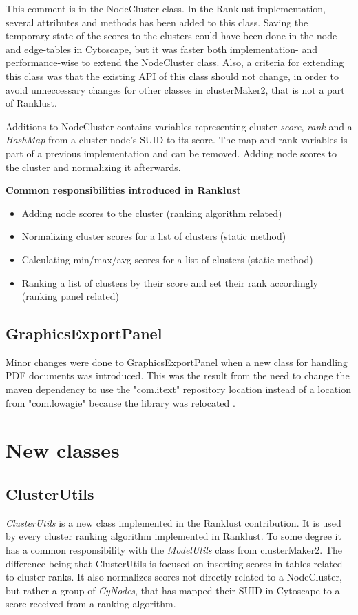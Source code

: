 This comment is in the NodeCluster class. In the Ranklust implementation,
several attributes and methods has been added to this class. Saving the
temporary state of the scores to the clusters could have been done in the node
and edge-tables in Cytoscape, but it was faster both implementation- and
performance-wise to extend the NodeCluster class. Also, a criteria for extending
this class was that the existing API of this class should not change, in order
to avoid unneccessary changes for other classes in clusterMaker2, that is not
a part of Ranklust. 

Additions to NodeCluster contains variables representing cluster \textit{score},
\textit{rank} and a \textit{HashMap} from a cluster-node's SUID to its score.
The map and rank variables is part of a previous implementation and can be
removed. Adding node scores to the cluster and normalizing it afterwards.

\textbf{Common responsibilities introduced in Ranklust}
\begin{itemize}
    \item Adding node scores to the cluster (ranking algorithm related)
    \item Normalizing cluster scores for a list of clusters (static method)
    \item Calculating min/max/avg scores for a list of clusters (static method)
    \item Ranking a list of clusters by their score and set their rank
        accordingly (ranking panel related)
\end{itemize}

\subsection{GraphicsExportPanel}
Minor changes were done to GraphicsExportPanel when a new class for handling PDF
documents was introduced. This was the result from the need to change the maven
dependency to use the "com.itext"\cite{itext} repository location instead of
a location from "com.lowagie" because the library was relocated
\cite{lowagie-to-itext}.

\section{New classes}
\subsection{ClusterUtils}
\textit{ClusterUtils} is a new class implemented in the Ranklust contribution.
It is used by every cluster ranking algorithm implemented in Ranklust. To some
degree it has a common responsibility with the \textit{ModelUtils} class from
clusterMaker2. The difference being that ClusterUtils is focused on inserting
scores in tables related to cluster ranks. It also normalizes scores not
directly related to a NodeCluster, but rather a group of \textit{CyNodes}, that
has mapped their SUID in Cytoscape to a score received from a ranking algorithm.

